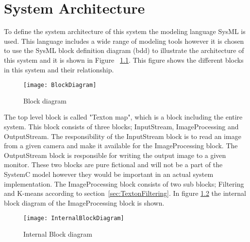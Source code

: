 \chapter{System Architecture}

To define the system architecture of this system the modeling language SysML is used. This language includes a wide range of modeling tools however it is chosen to use the SysML block definition diagram (bdd) to illustrate the architecture of this system and it is shown in Figure ~\ref{fig:BlockDiagram}. This figure shows the different blocks in this system and their relationship. 

\begin{figure}[H]
\centering
\texttt{[image: BlockDiagram]}
\caption{Block diagram}
\label{fig:BlockDiagram}
\end{figure}

The top level block is called "Texton map", which is a block including the entire system. This block consists of three blocks; InputStream, ImageProcessing and OutputStream. The responsibility of the InputStream block is to read an image from a given camera and make it available for the ImageProcessing block. The OutputStream block is responsible for writing the output image to a given monitor. These two blocks are pure fictional and will not be a part of the SystemC model however they would be important in an actual system implementation. The ImageProcessing block consists of two sub blocks; Filtering and K-means according to section~\ref{sec:TextonFiltering}. In figure \ref{fig:InternalBlockDiagram} the internal block diagram of the ImageProcessing block is shown.

\begin{figure}[H]
\centering
\texttt{[image: InternalBlockDiagram]}
\caption{Internal Block diagram}
\label{fig:InternalBlockDiagram}
\end{figure}